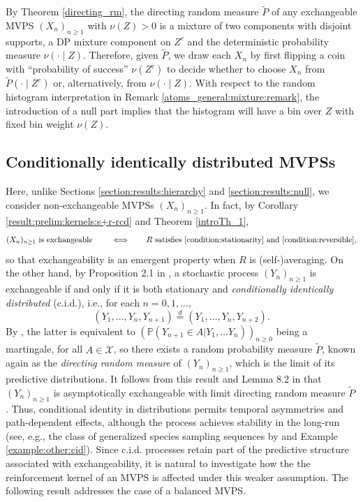 \documentclass[a4paper]{article}
\theoremstyle{plain}
\theoremstyle{remark}
\theoremstyle{definition}
\begin{document}
By Theorem \ref{directing_rm}, the directing random measure $\tilde{P}$ of any exchangeable MVPS $(X_n)_{n\geq1}$ with $\nu(Z)>0$ is a mixture of two components with disjoint supports, a DP mixture component on $Z^c$ and the deterministic probability measure $\nu(\cdot\mid Z)$. Therefore, given $\tilde{P}$, we draw each $X_n$ by first flipping a coin with ``probability of success'' $\nu(Z^c)$ to decide whether to choose $X_n$ from $\tilde{P}(\cdot\mid Z^c)$ or, alternatively, from $\nu(\cdot\mid Z)$. With respect to the random histogram interpretation in Remark \ref{atoms_general:mixture:remark}, the introduction of a null part implies that the histogram will have a bin over $Z$ with fixed bin weight $\nu(Z)$.

\subsection{Conditionally identically distributed MVPSs}\label{section:results:beyond}

Here, unlike Sections \ref{section:results:hierarchy} and \ref{section:results:null}, we consider non-exchangeable MVPSs $(X_n)_{n\geq1}$. In fact, by Corollary \ref{result:prelim:kernels:s+r-rcd} and Theorem \ref{introTh_1},
\begin{equation}\label{beyond:eq1}
(X_n)_{n\geq1}\mbox{ is exchangeable }\qquad\Longleftrightarrow\qquad R\mbox{ satisfies }\eqref{condition:stationarity}\mbox{ and }\eqref{condition:reversible},
\end{equation}
so that exchangeability is an emergent property when $R$ is (self-)averaging. On the other hand, by Proposition 2.1 in \cite{kallenberg1988}, a stochastic process $(Y_n)_{n\geq1}$ is exchangeable if and only if it is both stationary and \textit{conditionally identically distributed} (c.i.d.), i.e., for each $n=0,1,\ldots$,
\[(Y_1,\ldots,Y_n,Y_{n+1})\overset{d}{=}(Y_1,\ldots,Y_n,Y_{n+2}).\]
By \citet[][eq.\,(5)]{berti2004limit}, the latter is equivalent to $(\mathbb{P}(Y_{n+1}\in A|Y_1,\ldots Y_n))_{n\geq0}$ being a martingale, for all $A\in\mathcal{X}$, so there exists a random probability measure $\tilde{P}$, known again as the \textit{directing random measure} of $(Y_n)_{n\geq1}$, which is the limit of its predictive distributions. It follows from this result and Lemma 8.2 in \cite{aldous1985exchangeability} that $(Y_n)_{n\geq1}$ is asymptotically exchangeable with limit directing random measure $\tilde{P}$. Thus, conditional identity in distributions permits temporal asymmetries and path-dependent effects, although the process achieves stability in the long-run (see, e.g., the class of generalized species sampling sequences by \cite{bassetti2010} and Example \ref{example:other:cid}). Since c.i.d. processes retain part of the predictive structure associated with exchangeability, it is natural to investigate how the the reinforcement kernel of an MVPS is affected under this weaker assumption. The following result addresses the case of a balanced MVPS.
\end{document}
